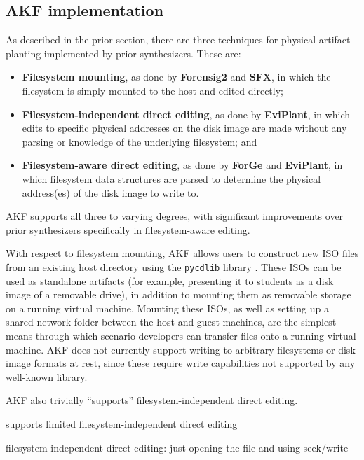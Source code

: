 \documentclass[letterpaper,12pt]{report}
\def\tightlist{}
\newcommand{\passthrough}[1]{#1}
\begin{document}
\subsection{AKF implementation}\label{akf-implementation}

As described in the prior section, there are three techniques for
physical artifact planting implemented by prior synthesizers. These are:

\begin{itemize}
\tightlist
\item
  \textbf{Filesystem mounting}, as done by \textbf{Forensig2} and
  \textbf{SFX}, in which the filesystem is simply mounted to the host
  and edited directly;
\item
  \textbf{Filesystem-independent direct editing}, as done by
  \textbf{EviPlant}, in which edits to specific physical addresses on
  the disk image are made without any parsing or knowledge of the
  underlying filesystem; and
\item
  \textbf{Filesystem-aware direct editing}, as done by \textbf{ForGe}
  and \textbf{EviPlant}, in which filesystem data structures are parsed
  to determine the physical address(es) of the disk image to write to.
\end{itemize}

AKF supports all three to varying degrees, with significant improvements
over prior synthesizers specifically in filesystem-aware editing.

With respect to filesystem mounting, AKF allows users to construct new
ISO files from an existing host directory using the
\passthrough{\lstinline!pycdlib!} library
\cite{lalancetteClalancettePycdlib2025}. These ISOs can be used as
standalone artifacts (for example, presenting it to students as a disk
image of a removable drive), in addition to mounting them as removable
storage on a running virtual machine. Mounting these ISOs, as well as
setting up a shared network folder between the host and guest machines,
are the simplest means through which scenario developers can transfer
files onto a running virtual machine. AKF does not currently support
writing to arbitrary filesystems or disk image formats at rest, since
these require write capabilities not supported by any well-known
library.

AKF also trivially ``supports'' filesystem-independent direct editing.

supports limited filesystem-independent direct editing

filesystem-independent direct editing: just opening the file and using
seek/write
\end{document}
